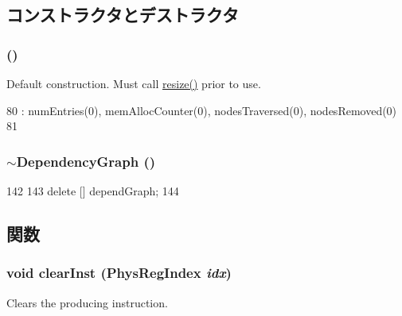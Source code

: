 \subsection{コンストラクタとデストラクタ}
\hypertarget{classDependencyGraph_a272991aeaffc4f6a74a9f3de8cb3e055}{
\subsubsection[{DependencyGraph}]{ ()}}
\label{classDependencyGraph_a272991aeaffc4f6a74a9f3de8cb3e055}
Default construction. Must call \hyperlink{classDependencyGraph_a3780426d320e4d44a0bc9f44ce6c2175}{resize()} prior to use. 


\begin{DoxyCode}
80         : numEntries(0), memAllocCounter(0), nodesTraversed(0), nodesRemoved(0)
81     { }
\end{DoxyCode}
\hypertarget{classDependencyGraph_aadf0cefbf15be129075d5c91be7c61b4}{
\subsubsection[{$\sim$DependencyGraph}]{\setlength{\rightskip}{0pt plus 5cm}$\sim${\bf DependencyGraph} ()}}
\label{classDependencyGraph_aadf0cefbf15be129075d5c91be7c61b4}



\begin{DoxyCode}
142 {
143     delete [] dependGraph;
144 }
\end{DoxyCode}


\subsection{関数}
\hypertarget{classDependencyGraph_a68804553aa4fc717c5e467b252ef37ca}{
\subsubsection[{clearInst}]{\setlength{\rightskip}{0pt plus 5cm}void clearInst ({\bf PhysRegIndex} {\em idx})}}
\label{classDependencyGraph_a68804553aa4fc717c5e467b252ef37ca}
Clears the producing instruction. 


